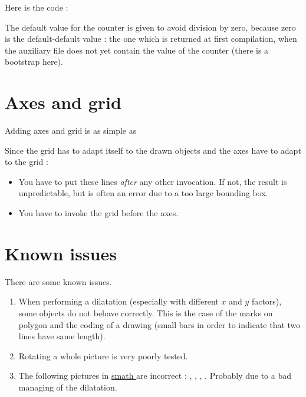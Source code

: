 Here is the code :



The default value for the  counter is given to avoid division by zero, because zero is the default-default value : the one which is returned at first compilation, when the auxiliary file does not yet contain the value of the counter (there is a bootstrap here).

\section{Axes and grid}

Adding axes and grid is as simple as



Since the grid has to adapt itself to the drawn objects and the axes have to adapt to the grid :
\begin{itemize}
    \item You have to put these lines \emph{after} any other  invocation. If not, the result is unpredictable, but is often an error due to a too large bounding box.
    \item You have to invoke the grid before the axes.
\end{itemize}

\section{Known issues}

There are some known issues.
\begin{enumerate}
    \item
        When performing a dilatation (especially with different \( x\) and \( y\) factors), some objects do not behave correctly. This is the case of the marks on polygon and the coding of a drawing (small bars in order to indicate that two lines have same length).
    \item
        Rotating a whole picture is very poorly tested.
    \item The following pictures in \href{ http://laurent.claessens-donadello.eu/smath.pdf }{ smath } are incorrect :  ,  ,  ,  . Probably due to a bad managing of the dilatation.
\end{enumerate}
